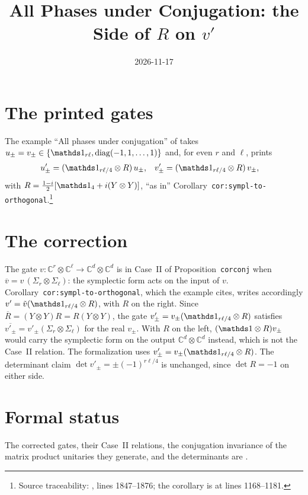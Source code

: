 \documentclass{article}
\title{All Phases under Conjugation: the Side of $R$ on $v'$}
\author{}
\date{2026-11-17}
\begin{document}
\maketitle
{}

\section{The printed gates}
The example ``All phases under conjugation'' of \cite{Cirac2017MPU} takes
$u_\pm=v_\pm\in\{\Id_{r\ell},\operatorname{diag}(-1,1,\dots,1)\}$ and,
for even $r$ and $\ell$, prints
\begin{align}
    u'_\pm & =(\Id_{r\ell/4}\otimes R)\,u_\pm, &
    v'_\pm & =(\Id_{r\ell/4}\otimes R)\,v_\pm,
    \label{eq:mpu_conjugation_example_r_side_1}
\end{align}
with $R=\tfrac{1-i}{2}[\Id_4+i(Y\otimes Y)]$, ``as in''
Corollary~\texttt{cor:sympl-to-orthogonal}.\footnote{Source traceability:
    , lines 1847--1876; the corollary is
    at lines 1168--1181.}

\section{The correction}
The gate $v\colon\mathbb C^r\otimes\mathbb C^\ell\to\mathbb C^d\otimes\mathbb C^d$
is in Case~II of Proposition~\texttt{corconj} when
$\overline v=v\,(\Sigma_r\otimes\Sigma_\ell)$: the symplectic form acts on the
input of $v$. Corollary~\texttt{cor:sympl-to-orthogonal}, which the example
cites, writes accordingly $v'=\tilde v(\Id_{r\ell/4}\otimes R)$, with $R$
on the right. Since $\overline R=(Y\otimes Y)R=R(Y\otimes Y)$, the gate
$v'_\pm=v_\pm(\Id_{r\ell/4}\otimes R)$ satisfies
$\overline{v'_\pm}=v'_\pm(\Sigma_r\otimes\Sigma_\ell)$ for the real $v_\pm$.
With $R$ on the left, $(\Id\otimes R)v_\pm$ would carry the symplectic
form on the output $\mathbb C^d\otimes\mathbb C^d$ instead, which is not the
Case~II relation. The formalization uses $v'_\pm=v_\pm(\Id_{r\ell/4}\otimes R)$.
The determinant claim $\det v'_\pm=\pm(-1)^{r\ell/4}$ is unchanged, since
$\det R=-1$ on either side.

\section{Formal status}
The corrected gates, their Case~II relations, the conjugation invariance of
the matrix product unitaries they generate, and the determinants are
.



\end{document}
